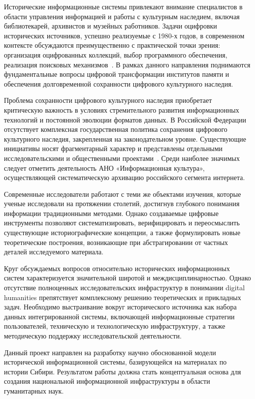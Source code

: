 Исторические информационные системы привлекают внимание специалистов в области управления информацией и работы с культурным наследием, включая библиотекарей, архивистов и музейных работников.
Задачи оцифровки исторических источников, успешно реализуемые с 1980-х годов, в современном контексте обсуждаются преимущественно с практической точки зрения: организация оцифрованных коллекций, выбор программного обеспечения, реализация поисковых механизмов~\cite{7_yumashova2016}.
В рамках данного направления поднимаются фундаментальные вопросы цифровой трансформации институтов памяти и обеспечения долговременной сохранности цифрового культурного наследия.

Проблема сохранности цифрового культурного наследия приобретает критическую важность в условиях стремительного развития информационных технологий и постоянной эволюции форматов данных.
В Российской Федерации отсутствует комплексная государственная политика сохранения цифрового культурного наследия, закрепленная на законодательном уровне.
Существующие инициативы носят фрагментарный характер и представлены отдельными исследовательскими и общественными проектами~\cite{8_gorlova2021}.
Среди наиболее значимых следует отметить деятельность АНО «Информационная культура», осуществляющей систематическую архивацию российского сегмента интернета.

Современные исследователи работают с теми же объектами изучения, которые ученые исследовали на протяжении столетий, достигнув глубокого понимания информации традиционными методами.
Однако создаваемые цифровые инструменты позволяют систематизировать, верифицировать и переосмыслить существующие историографические концепции, а также формулировать новые теоретические построения, возникающие при абстрагировании от частных деталей исследуемого материала.

Круг обсуждаемых вопросов относительно исторических информационных систем характеризуется значительной широтой и междисциплинарностью.
Однако отсутствие полноценных исследовательских инфраструктур в понимании digital humanities препятствует комплексному решению теоретических и прикладных задач.
Необходимо выстраивание вокруг исторического источника как набора данных интегрированной системы, включающей информационные стратегии пользователей, техническую и технологическую инфраструктуру, а также методическую поддержку исследовательской деятельности.

Данный проект направлен на разработку научно обоснованной модели исторической информационной системы, базирующейся на материалах по истории Сибири.
Результатом работы должна стать концептуальная основа для создания национальной информационной инфраструктуры в области гуманитарных наук.


